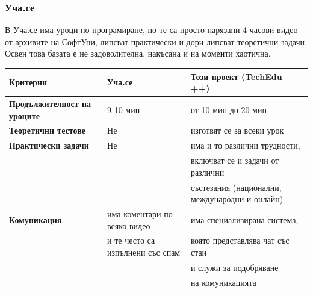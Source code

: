 \documentclass[12pt]{article}
\begin{document}
	\subsubsection{Уча.се}
	В Уча.се има уроци по програмиране, но те са просто нарязани 4-часови видео от архивите на СофтУни, липсват практически и дори липсват теоретични задачи. Освен това базата е не задоволителна, накъсана и на моменти хаотична.
	\begin{table}[ht]
		\centering
		\resizebox{\textwidth}{!}
		{
			\begin{tabular}{l|l|l}
				\bf{Критерии} & \bf{Уча.се} & \bf{Този проект (TechEdu ++)}\\
				\hline
				\bf{Продължителност на уроците} & 9-10 мин & от 10 мин до 20 мин \\
				\hline
				\bf{Теоретични тестове} & Не & изготвят се за всеки урок\\
				\hline
				\bf{Практически задачи} & Не & има и то различни трудности,\\
				& & включват се и задачи от различни \\
				& & състезания (национални, международни и онлайн)\\
				\hline
				\bf{Комуникация} & има коментари по всяко видео & има специализирана система,\\
				& и те често са изпълнени със спам & която представлява чат със стаи \\
				& & и служи за подобряване\\
				& & на комуникацията\\
				\hline
			\end{tabular}
		}
	\end{table}\\
\end{document}
